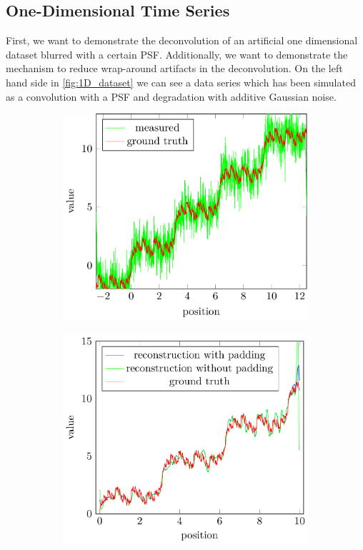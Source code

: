 \documentclass{juliacon}
\begin{document}
    \subsection{One-Dimensional Time Series}
        First, we want to demonstrate the deconvolution of an artificial one dimensional dataset blurred with a certain PSF.
        Additionally, we want to demonstrate the mechanism to reduce wrap-around artifacts in the deconvolution.
        On the left hand side in \autoref{fig:1D_dataset} we can see a data series which has been simulated 
        as a convolution with a PSF and degradation with additive Gaussian noise.
        \begin{figure}[H]
            \begin{subfigure}[b]{.25\textwidth}
                \centering
                \includegraphics[width=\textwidth]{figures/1d_plot_data_blurred.png}
                \caption{}
                \label{fig:1D_dataseta}
            \end{subfigure}%
            \begin{subfigure}[b]{.25\textwidth}
                \centering
                \includegraphics[width=\textwidth]{figures/1d_plot_data_res_pad_vs_nopad.png}

\end{subfigure}
\end{figure}
\end{document}
